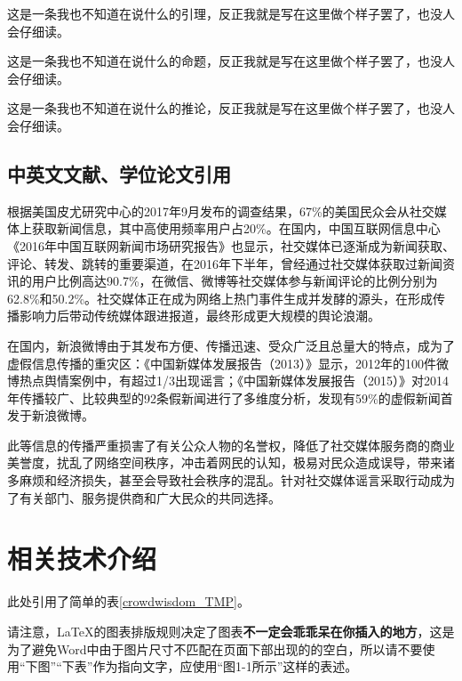 \documentclass[a4paper,AutoFakeBold,oneside,12pt]{book}
\begin{document}
\begin{lemma}
	这是一条我也不知道在说什么的引理，反正我就是写在这里做个样子罢了，也没人会仔细读。
\end{lemma}

\begin{proposition}
	这是一条我也不知道在说什么的命题，反正我就是写在这里做个样子罢了，也没人会仔细读。
\end{proposition}

\begin{corollary}
	这是一条我也不知道在说什么的推论，反正我就是写在这里做个样子罢了，也没人会仔细读。
\end{corollary}

\subsection{中英文文献、学位论文引用}
根据美国皮尤研究中心的2017年9月发布的调查结果\cite{pew_news_use_2017}，67\%的美国民众会从社交媒体上获取新闻信息，其中高使用频率用户占20\%。在国内，中国互联网信息中心《2016年中国互联网新闻市场研究报告》\cite{internet_news_2016}也显示，社交媒体已逐渐成为新闻获取、评论、转发、跳转的重要渠道，在2016年下半年，曾经通过社交媒体获取过新闻资讯的用户比例高达90.7\%，在微信、微博等社交媒体参与新闻评论的比例分别为62.8\%和50.2\%。社交媒体正在成为网络上热门事件生成并发酵的源头，在形成传播影响力后带动传统媒体跟进报道，最终形成更大规模的舆论浪潮。\cite{Yang2012Automatic}

在国内，新浪微博由于其发布方便、传播迅速、受众广泛且总量大的特点，成为了虚假信息传播的重灾区：《中国新媒体发展报告（2013）》\cite{唐绪军2013中国新媒体发展报告}显示，2012年的100件微博热点舆情案例中，有超过1/3出现谣言；《中国新媒体发展报告（2015）》\cite{唐绪军2015中国新媒体发展报告}对2014年传播较广、比较典型的92条假新闻进行了多维度分析，发现有59\%的虚假新闻首发于新浪微博。

此等信息的传播严重损害了有关公众人物的名誉权，降低了社交媒体服务商的商业美誉度，扰乱了网络空间秩序，冲击着网民的认知，极易对民众造成误导，带来诸多麻烦和经济损失，甚至会导致社会秩序的混乱。针对社交媒体谣言采取行动成为了有关部门、服务提供商和广大民众的共同选择。\cite{周兴2017基于深度学习的谣言检测及模式挖掘}

\section{相关技术介绍}
此处引用了简单的表\ref{crowdwisdom_TMP}。

请注意，\LaTeX{}的图表排版规则决定了图表\textbf{不一定会乖乖呆在你插入的地方}，这是为了避免Word中由于图片尺寸不匹配在页面下部出现的的空白，所以请不要使用“下图”“下表”作为指向文字，应使用“图1-1所示”这样的表述。
\end{document}
